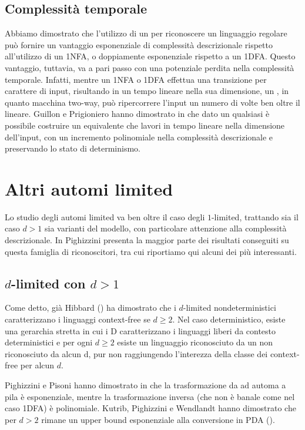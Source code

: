 \subsection{Complessità temporale}
Abbiamo dimostrato che l'utilizzo di un  per riconoscere un linguaggio regolare può fornire un vantaggio esponenziale di complessità descrizionale rispetto all'utilizzo di un 1NFA, o doppiamente esponenziale rispetto a un 1DFA. Questo vantaggio, tuttavia, va a pari passo con una potenziale perdita nella complessità temporale. Infatti, mentre un 1NFA o 1DFA effettua una transizione per carattere di input, risultando in un tempo lineare nella sua dimensione, un , in quanto macchina two-way, può ripercorrere l'input un numero di volte ben oltre il lineare. Guillon e Prigioniero hanno dimostrato in \cite{Guillon:19:linearlimited} che dato un qualsiasi  è possibile costruire un  equivalente che lavori in tempo lineare nella dimensione dell'input, con un incremento polinomiale nella complessità descrizionale e preservando lo stato di determinismo.



\section{Altri automi limited}
Lo studio degli automi limited va ben oltre il caso degli $1$-limited, trattando sia il caso $d>1$ sia varianti del modello, con particolare attenzione alla complessità descrizionale. In \cite{Pighizzini:19:limited} Pighizzini presenta la maggior parte dei risultati conseguiti su questa famiglia di riconoscitori, tra cui riportiamo qui alcuni dei più interessanti.


\subsection{\texorpdfstring{$d$-limited con $d>1$}{d-limited con d>1}}
Come detto, già Hibbard (\cite{Hibbard:67:CFdet}) ha dimostrato che i $d$-limited nondeterministici caratterizzano i linguaggi context-free se $d\geq2$. Nel caso deterministico, esiste una gerarchia stretta in cui i D caratterizzano i linguaggi liberi da contesto deterministici e per ogni $d\geq2$ esiste un linguaggio riconosciuto da un  non riconosciuto da alcun \la d, pur non raggiungendo l'interezza della classe dei context-free per alcun $d$.

Pighizzini e Pisoni hanno dimostrato in \cite{Pighizzini:14:limitedCF} che la trasformazione da  ad automa a pila è esponenziale, mentre la trasformazione inversa (che non è banale come nel caso 1DFA\tto{}) è polinomiale. Kutrib, Pighizzini e Wendlandt hanno dimostrato che per $d>2$ rimane un upper bound esponenziale alla conversione in PDA (\cite{Kutrib:18:complexlimited}).


